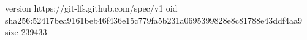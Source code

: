 version https://git-lfs.github.com/spec/v1
oid sha256:52417bea9161beb46f436e15c779fa5b231a0695399828e8c81788e43ddf4aa9
size 239433
